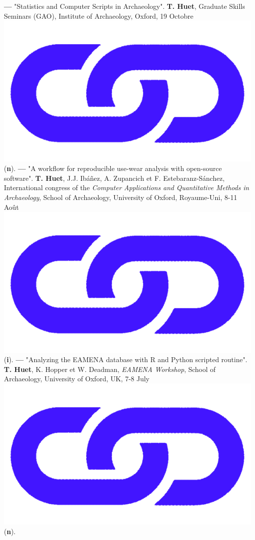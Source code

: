 \documentclass{article}
\begin{document}
{\textbf{--- }"Statistics and Computer Scripts in Archaeology". \textbf{T. Huet}, Graduate Skills Seminars (GAO), Institute of Archaeology, Oxford, 19 Octobre \href{http://shinyserver.cfs.unipi.it:3838/teach/stats/gao/_site/#/title-slide}{\includegraphics[scale=0.02]{link_darkblue.png}} (\textbf{n}).
\smallbreak
\textbf{--- }"A workflow for reproducible use-wear analysis with open-source software". \textbf{T. Huet}, J.J. Ibáñez, A. Zupancich et F. Estebaranz-Sánchez, International congress of the \textit{Computer Applications and Quantitative Methods in Archaeology}, School of Archaeology, University of Oxford, Royaume-Uni, 8-11 Août \href{https://zoometh.github.io/reveal.js/projects/caa_3dlithic}{\includegraphics[scale=0.02]{link_darkblue.png}} (\textbf{i}).
\smallbreak
\textbf{--- }"Analyzing the EAMENA database with R and Python scripted routine". \textbf{T. Huet}, K. Hopper et W. Deadman, \textit{EAMENA Workshop}, School of Archaeology, University of Oxford, UK, 7-8 July \href{https://eamena-project.github.io/reveal.js/projects/time.html}{\includegraphics[scale=0.02]{link_darkblue.png}} (\textbf{n}).
}
\end{document}
